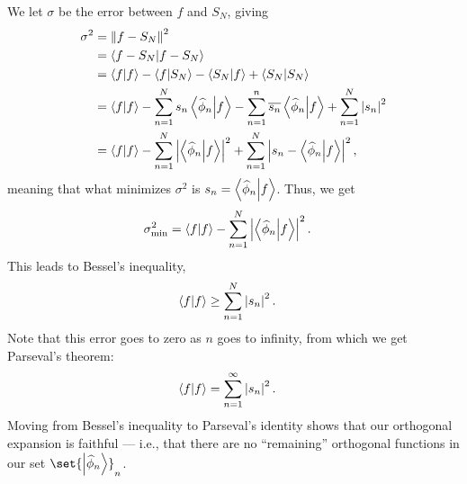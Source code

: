 \documentclass[10pt]{mypackage}
\begin{document}
We let $\sigma$ be the error between $f$ and $S_N$, giving
\begin{align*}
  \sigma^2 &= \norm{f - S_N}^2\\
           &= \braket{f-S_N}{f-S_N}\\
           &= \braket{f}{f} - \braket{f}{S_N}-\braket{S_N}{f} + \braket{S_N}{S_N}\\
           &= \braket{f}{f} - \sum_{n=1}^{N}s_n\braket{\widehat{\phi}_n}{f} - \sum_{n=1}^{n}\overline{s_n}\braket{\widehat{\phi}_n}{f} + \sum_{n=1}^{N}\left\vert s_n \right\vert^2\\
           &= \braket{f}{f} - \sum_{n=1}^{N}\left\vert \braket{\widehat{\phi}_n}{f} \right\vert^2 + \sum_{n=1}^{N}\left\vert s_n - \braket{\widehat{\phi}_n}{f} \right\vert^2,
\end{align*}
meaning that what minimizes $\sigma^2$ is $s_n = \braket{\widehat{\phi}_n}{f}$. Thus, we get
\begin{align*}
  \sigma^2_{\text{min}} &= \braket{f}{f} - \sum_{n=1}^{N}\left\vert \braket{\widehat{\phi}_n}{f} \right\vert^2.
\end{align*}
This leads to Bessel's inequality,
\begin{align*}
  \braket{f}{f} &\geq \sum_{n=1}^{N}\left\vert s_n \right\vert^2.
\end{align*}
Note that this error goes to zero as $n$ goes to infinity, from which we get Parseval's theorem:
\begin{align*}
  \braket{f}{f} &= \sum_{n=1}^{\infty}\left\vert s_n \right\vert^2.
\end{align*}
Moving from Bessel's inequality to Parseval's identity shows that our orthogonal expansion is faithful --- i.e., that there are no ``remaining'' orthogonal functions in our set $\set{\ket{\widehat{\phi}_n}}_{n}$.\newline
\end{document}
